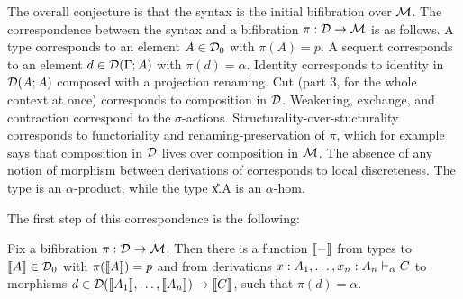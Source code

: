 The overall conjecture is that the syntax is the initial bifibration
over $\mathcal{M}$.  The correspondence between the syntax and a bifibration $\pi
: \mathcal{D} \to \mathcal{M}$ is as follows.  A type  corresponds to an
element $A \in \mathcal{D}_0$ with $\pi(A) = p$.  A sequent
 corresponds to an element $d \in \mathcal{D}(\Gamma;A)$
with $\pi(d) = \alpha$.  Identity  corresponds to
identity in $\mathcal{D}(A;A)$ composed with a projection renaming.  Cut (part 3,
for the whole context at once) corresponds to composition in $\mathcal{D}$.
Weakening, exchange, and contraction correspond to the $\sigma$-actions.
Structurality-over-stucturality corresponds to functoriality and
renaming-preservation of $\pi$, which for example says that composition
in $\mathcal{D}$ lives over composition in $\mathcal{M}$.  The absence of any notion of
morphism between derivations of  corresponds to
local discreteness.  The type \F{\alpha}{\Delta} is an $\alpha$-product,
while the type \U{x.\alpha}{\Delta}{A} is an $\alpha$-hom.

The first step of this correspondence is the following:

\begin{theorem}
Fix a bifibration $\pi : \mathcal{D} \to \mathcal{M}$.  Then there is a function $\llbracket -
\rrbracket$ from types  to $\llbracket A \rrbracket \in \mathcal{D}_0$ with $\pi(\llbracket
A \rrbracket) = p$ and from derivations $x:A_1, \ldots,
  x_n:A_n \vdash_{\alpha} C$ to morphisms $d \in \mathcal{D}(\llbracket A_1 \rrbracket, \dots, \llbracket
A_n \rrbracket) \to \llbracket C \rrbracket$, such that $\pi(d) = \alpha$.
\end{theorem}

